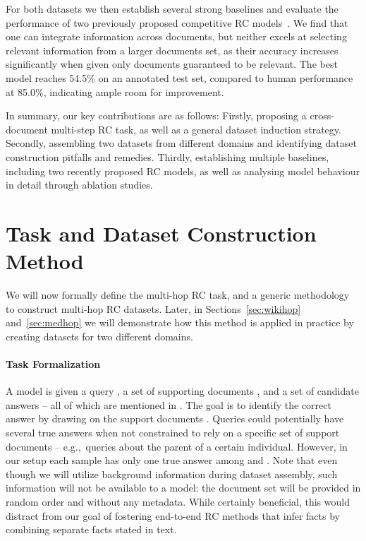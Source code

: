 \documentclass[11pt,letterpaper]{article}
\begin{document}
For both datasets we then establish several strong baselines and evaluate the performance of two previously proposed competitive RC models~\cite{Seo2016BidAF,Weissenborn2017fastQA}.
We find that one can integrate information across documents, but neither excels at selecting relevant information from a larger documents set, as their accuracy increases significantly when given only documents guaranteed to be relevant.
The best model reaches 54.5\% on an annotated test set, compared to human performance at 85.0\%, indicating ample room for improvement.



In summary, our key contributions are as follows:
Firstly, proposing a cross-document multi-step RC task, as well as a general dataset induction strategy.
Secondly, assembling two datasets from different domains and identifying dataset construction pitfalls and remedies.
Thirdly, establishing multiple baselines, including two recently proposed RC models, as well as analysing model behaviour in detail through ablation studies.




\section{Task and Dataset Construction Method}
\label{sec:datasets_abstract}
We will now formally define the multi-hop RC task, and a generic methodology to construct multi-hop RC datasets.
Later, in Sections~\ref{sec:wikihop} and~\ref{sec:medhop} we will demonstrate how this method is applied in practice by creating datasets for two different domains.



\paragraph{Task Formalization}
A model is given a query , a set of supporting documents , and a set of candidate answers  -- all of which are mentioned in .
The goal is to identify the correct answer  by drawing on the support documents . 
Queries could potentially have several true answers when not constrained to rely on a specific set of support documents -- e.g.,\ queries about the parent of a certain individual.
However, in our setup each sample has only one true answer among  and .
Note that even though we will utilize background information during dataset assembly, such information will not be available to a model: 
the document set will be provided in random order and without any metadata. 
While certainly beneficial, this would distract from our goal of fostering end-to-end RC methods that infer facts by combining separate facts stated in text.
\end{document}

